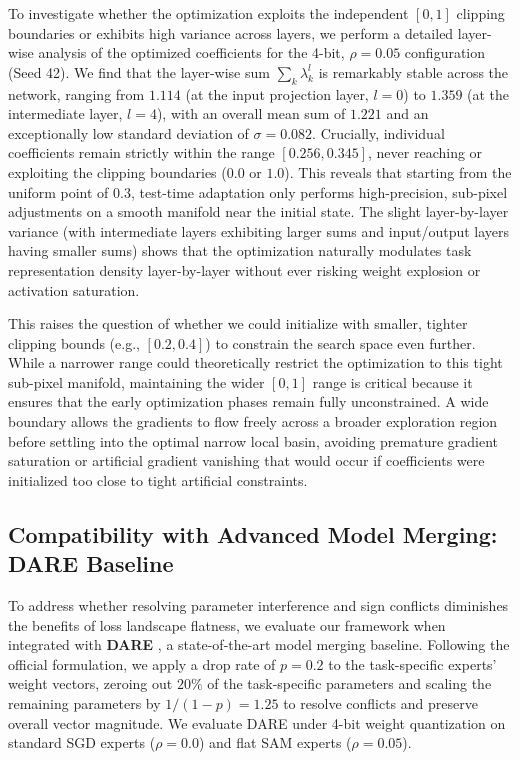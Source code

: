 To investigate whether the optimization exploits the independent $[0, 1]$ clipping boundaries or exhibits high variance across layers, we perform a detailed layer-wise analysis of the optimized coefficients for the 4-bit, $\rho=0.05$ configuration (Seed 42). We find that the layer-wise sum $\sum_k \lambda^l_k$ is remarkably stable across the network, ranging from $1.114$ (at the input projection layer, $l=0$) to $1.359$ (at the intermediate layer, $l=4$), with an overall mean sum of $1.221$ and an exceptionally low standard deviation of $\sigma = 0.082$. Crucially, individual coefficients remain strictly within the range $[0.256, 0.345]$, never reaching or exploiting the clipping boundaries ($0.0$ or $1.0$). This reveals that starting from the uniform point of $0.3$, test-time adaptation only performs high-precision, sub-pixel adjustments on a smooth manifold near the initial state. The slight layer-by-layer variance (with intermediate layers exhibiting larger sums and input/output layers having smaller sums) shows that the optimization naturally modulates task representation density layer-by-layer without ever risking weight explosion or activation saturation.

This raises the question of whether we could initialize with smaller, tighter clipping bounds (e.g., $[0.2, 0.4]$) to constrain the search space even further. While a narrower range could theoretically restrict the optimization to this tight sub-pixel manifold, maintaining the wider $[0, 1]$ range is critical because it ensures that the early optimization phases remain fully unconstrained. A wide boundary allows the gradients to flow freely across a broader exploration region before settling into the optimal narrow local basin, avoiding premature gradient saturation or artificial gradient vanishing that would occur if coefficients were initialized too close to tight artificial constraints.

\subsection{Compatibility with Advanced Model Merging: DARE Baseline}
\label{sec:exp_dare}
To address whether resolving parameter interference and sign conflicts diminishes the benefits of loss landscape flatness, we evaluate our framework when integrated with \textbf{DARE} \cite{Yu2023DARE}, a state-of-the-art model merging baseline. Following the official formulation, we apply a drop rate of $p = 0.2$ to the task-specific experts' weight vectors, zeroing out $20\%$ of the task-specific parameters and scaling the remaining parameters by $1/(1-p) = 1.25$ to resolve conflicts and preserve overall vector magnitude. We evaluate DARE under 4-bit weight quantization on standard SGD experts ($\rho = 0.0$) and flat SAM experts ($\rho = 0.05$).

